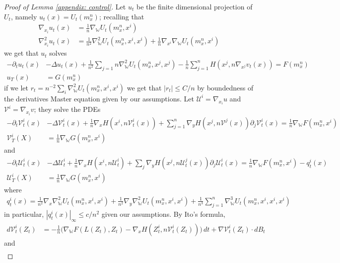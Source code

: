 \documentclass[11pt,reqno]{amsart}
\numberwithin{equation}{section}
\theoremstyle{definition}
\newcommand{\wgrad}{\nabla_{\W}}
\newcommand{\W}{\mathbb W}
\begin{document}
\begin{proof}[Proof of Lemma \ref{appendix: control}]
Let $u_t$ be the finite dimensional projection of $U_t$, namely $u_t(x)=U_t(m_x^n)$; recalling that 
\begin{align*}
\nabla_{x_i} u_t(x)&=\frac{1}{n}\wgrad U_t(m_x^n,x^i)\\
\nabla^2_{x_i} u_t(x)&= \frac{1}{n^2}\wgrad^2 U_t(m_x^n,x^i,x^i)+\frac 1n \nabla_{x^i}\wgrad U_t(m_x^n,x^i)
\end{align*}
we get that $u_t$ solves
\begin{align*}
    -\partial_t u_t(x)&-\Delta u_t(x)+\frac{1}{n^2}\sum_{j=1}n\wgrad^2 U_t(m_x^n,x^j,x^j)-\frac{1}{n}\sum_{j=1}^n H(x^j,n \nabla_{x^j} v_t(x))=F(m_x^n)\\
    u_T(x)&=G(m_x^n)
\end{align*}
if we let $r_t= n^{-2}\sum_i \wgrad^2 U_t(m_x^n,x^i,x^i)$ we get that $|r_t|\leq C/n$ by boundedness of the derivatives Master equation given by our assumptions. Let $\mathcal U^i=\nabla_{x_i} u$ and $\mathcal V^i=\nabla_{x_i} v$; they solve the PDEs
\begin{align*}
    -\partial_t \mathcal V^i_t(x)&-\Delta \mathcal V_t^i(x)+\frac 1n \nabla_x H(x^i,n\mathcal V_t^i(x))+\sum_{j=1}^n \nabla_y H(x^j,n\mathcal V^j(x))\partial_j \mathcal V^i_t(x)=\frac 1n \wgrad F(m_x^n,x^i)\\
    \mathcal V_T^i(X)&=\frac1n \wgrad G(m_x^n,x^i)
\end{align*}
and 
\begin{align*}
    -\partial_t \mathcal U^i_t(x)&-\Delta \mathcal U_t^i+\frac 1n \nabla_x H(x^i,n\mathcal U_t^i)+\sum_{j} \nabla_y H(x^j,n\mathcal U^j_t(x))\partial_j \mathcal U^i_t(x)=\frac 1n \wgrad F(m_x^n,x^i)-q_t^i(x)\\
    \mathcal U_T^i(X)&=\frac1n \wgrad G(m_x^n,x^i)
\end{align*}
where 
\begin{align*}
    q_t^i(x)=\frac{1}{n^2} \nabla_x\wgrad^2 U_t(m_x^n,x^i,x^i)+\frac{1}{n^2} \nabla_y\wgrad^2 U_t(m_x^n,x^i,x^i)+\frac {1}{n^3}\sum_{j=1}^n\wgrad ^3 U_t(m_x^n,x^i,x^i,x^i)
\end{align*}
in particular, $|q_t^i(x)|_\infty \leq c/n^2$ given our assumptions. By Ito's formula,
\begin{align*}
    d\mathcal V_t^i(Z_t)&= -\frac 1n \Big(\wgrad F(L(Z_t),Z_t)-\nabla_x H(Z_t^i,n \mathcal V_t^i(Z_t))\Big)\,dt+\nabla \mathcal V_t^i(Z_t)\cdot dB_t
\end{align*}
and
\begin{align*}

\end{align*}
\end{proof}
\end{document}
